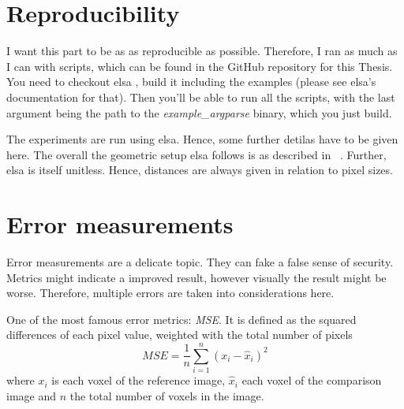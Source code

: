 \section{Reproducibility}\label{sec:experiments_repoduction}

I want this part to be as as reproducible as possible. Therefore, I ran as much as I can with
scripts, which can be found in the GitHub repository for this Thesis. You need to checkout elsa
, build it including the examples (please see elsa's documentation for that).
Then you'll be able to run all the scripts, with the last argument being the path to the
\textit{example\_argparse} binary, which you just build.

The experiments are run using elsa. Hence, some further detilas have to be given here. The overall
the geometric setup elsa follows is as described in
\citeauthor{hartley_multiple_2003}~\cite{hartley_multiple_2003}. Further, elsa is itself unitless.
Hence, distances are always given in relation to pixel sizes.

\section{Error measurements}\label{sec:error_measurements}

Error measurements are a delicate topic. They can fake a false sense of security. Metrics might
indicate a improved result, however visually the result might be worse. Therefore, multiple errors
are taken into considerations here.

\begin{definition}
	One of the most famous error metrics: \textit{\gls{MSE}}. It is defined as the
	squared differences of each pixel value, weighted with the total number of pixels
	\[ MSE = \frac{1}{n} \sum_{i=1}^{n}(x_i - \hat{x}_i)^2\]
	where \(x_i\) is each voxel of the reference image, \(\hat{x}_i\) each voxel of the comparison
	image and \(n\) the total number of voxels in the image.
\end{definition}


